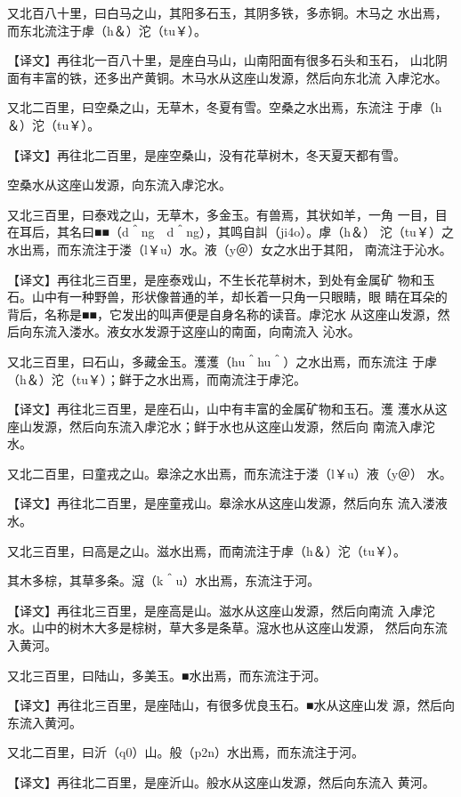 \documentclass[a4paper,12pt,UTF8,twoside]{ctexbook}
\begin{document}
又北百八十里，曰白马之山，其阳多石玉，其阴多铁，多赤铜。木马之 水出焉，而东北流注于虖（h＆）沱（tu￥）。

【译文】再往北一百八十里，是座白马山，山南阳面有很多石头和玉石， 山北阴面有丰富的铁，还多出产黄铜。木马水从这座山发源，然后向东北流 入虖沱水。

又北二百里，曰空桑之山，无草木，冬夏有雪。空桑之水出焉，东流注 于虖（h＆）沱（tu￥）。

【译文】再往北二百里，是座空桑山，没有花草树木，冬天夏天都有雪。

空桑水从这座山发源，向东流入虖沱水。

又北三百里，曰泰戏之山，无草木，多金玉。有兽焉，其状如羊，一角 一目，目在耳后，其名曰■■（d＾ng　d＾ng），其鸣自訆（ji4o）。虖（h＆） 沱（tu￥）之水出焉，而东流注于溇（l￥u）水。液（y＠）女之水出于其阳， 南流注于沁水。

【译文】再往北三百里，是座泰戏山，不生长花草树木，到处有金属矿 物和玉石。山中有一种野兽，形状像普通的羊，却长着一只角一只眼睛，眼 睛在耳朵的背后，名称是■■，它发出的叫声便是自身名称的读音。虖沱水 从这座山发源，然后向东流入溇水。液女水发源于这座山的南面，向南流入 沁水。

又北三百里，曰石山，多藏金玉。濩濩（hu＾hu＾）之水出焉，而东流注 于虖（h＆）沱（tu￥）；鲜于之水出焉，而南流注于虖沱。

【译文】再往北三百里，是座石山，山中有丰富的金属矿物和玉石。濩 濩水从这座山发源，然后向东流入虖沱水；鲜于水也从这座山发源，然后向 南流入虖沱水。

又北二百里，曰童戎之山。皋涂之水出焉，而东流注于溇（l￥u）液（y＠） 水。

【译文】再往北二百里，是座童戎山。皋涂水从这座山发源，然后向东 流入溇液水。

又北三百里，曰高是之山。滋水出焉，而南流注于虖（h＆）沱（tu￥）。

其木多棕，其草多条。滱（k＾u）水出焉，东流注于河。

【译文】再往北三百里，是座高是山。滋水从这座山发源，然后向南流 入虖沱水。山中的树木大多是棕树，草大多是条草。滱水也从这座山发源， 然后向东流入黄河。

又北三百里，曰陆山，多美玉。■水出焉，而东流注于河。

【译文】再往北三百里，是座陆山，有很多优良玉石。■水从这座山发 源，然后向东流入黄河。

又北二百里，曰沂（q0）山。般（p2n）水出焉，而东流注于河。

【译文】再往北二百里，是座沂山。般水从这座山发源，然后向东流入 黄河。
\end{document}
